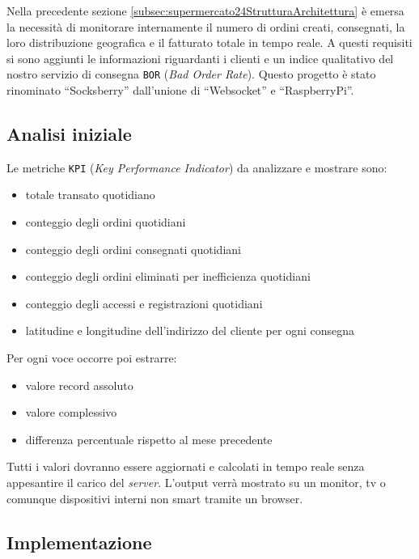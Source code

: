 Nella precedente sezione \ref{subsec:supermercato24StrutturaArchitettura} è emersa la necessità di monitorare internamente il numero di ordini creati, consegnati, la loro distribuzione geografica e il fatturato totale in tempo reale.
A questi requisiti si sono aggiunti le informazioni riguardanti i clienti e un indice qualitativo del nostro servizio di consegna \verb+BOR+ (\textit{Bad Order Rate}).
Questo progetto è stato rinominato ``Socksberry'' dall'unione di ``Websocket'' e ``RaspberryPi''.

\subsection{Analisi iniziale}
\label{subsec:socksberryAnalisi}

\noindent
Le metriche \verb+KPI+ (\textit{Key Performance Indicator}) da analizzare e mostrare sono:
\begin{itemize}
  \item totale transato quotidiano
  \item conteggio degli ordini quotidiani
  \item conteggio degli ordini consegnati quotidiani
  \item conteggio degli ordini eliminati per inefficienza quotidiani
  \item conteggio degli accessi e registrazioni quotidiani
  \item latitudine e longitudine dell'indirizzo del cliente per ogni consegna
\end{itemize}

\bigskip
\noindent
Per ogni voce occorre poi estrarre:
\begin{itemize}
  \item valore record assoluto
  \item valore complessivo
  \item differenza percentuale rispetto al mese precedente
\end{itemize}

Tutti i valori dovranno essere aggiornati e calcolati in tempo reale senza appesantire il carico del \textit{server}.
L'output verrà mostrato su un monitor, tv o comunque dispositivi interni non smart tramite un browser.

\subsection{Implementazione}
\label{subsec:socksberryImplementazione}

